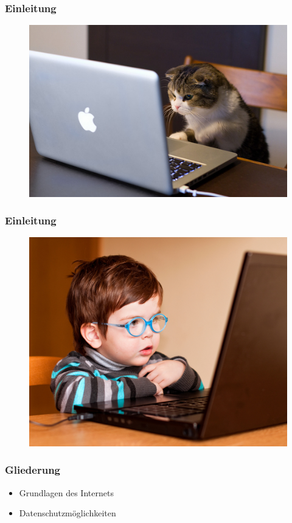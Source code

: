 \documentclass[12pt]{beamer}
\begin{document}
\begin{frame}
  \frametitle{Einleitung}
  \begin{figure}
    \includegraphics[height=0.7\textheight]{img/internet_user4.jpg}
  \end{figure}
\end{frame}

\begin{frame}
  \frametitle{Einleitung}
  \begin{figure}
    \includegraphics[height=0.7\textheight]{img/internet_user2.jpg}
  \end{figure}
\end{frame}

\begin{frame}
  \frametitle{Gliederung}
  \begin{itemize} \Large
    \item Grundlagen des Internets
    \item Datenschutzmöglichkeiten
  \end{itemize}
\end{frame}
\end{document}
